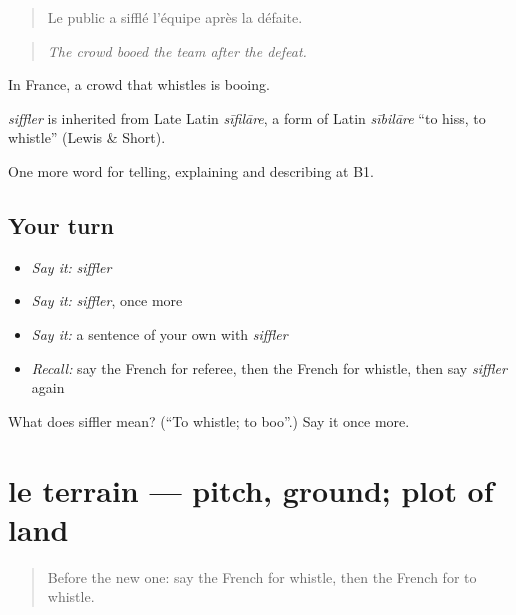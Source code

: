 \begin{quote}
Le public a sifflé l'équipe après la défaite.
\end{quote}

\begin{quote}
\emph{The crowd booed the team after the defeat.}
\end{quote}

In France, a crowd that whistles is booing.

\begin{cousinweb}
\emph{siffler} is inherited from Late Latin \emph{sīfilāre}, a form of Latin \emph{sībilāre} \textquotedblleft{}to hiss, to whistle\textquotedblright{} (Lewis \& Short).
\end{cousinweb}

\begin{grammarlens}[title={What you've built}]
One more word for telling, explaining and describing at B1.
\end{grammarlens}

\subsection*{Your turn}
\begin{itemize}
\raggedright
  \item \emph{Say it:} \emph{siffler}
  \item \emph{Say it:} \emph{siffler}, once more
  \item \emph{Say it:} a sentence of your own with \emph{siffler}
  \item \emph{Recall:} say the French for referee, then the French for whistle, then say \emph{siffler} again
\end{itemize}

\begin{tcolorbox}[breakable,colback=teal!4,colframe=teal!35!black,title={Before you move on}]
What does siffler mean? (\textquotedblleft{}To whistle; to boo\textquotedblright{}.) Say it once more.
\end{tcolorbox}
\section[le terrain]{le terrain — pitch, ground; plot of land}

\label{lesson:FR-C505-terrain}



\begin{quote}
Before the new one: say the French for whistle, then the French for to whistle.
\end{quote}

